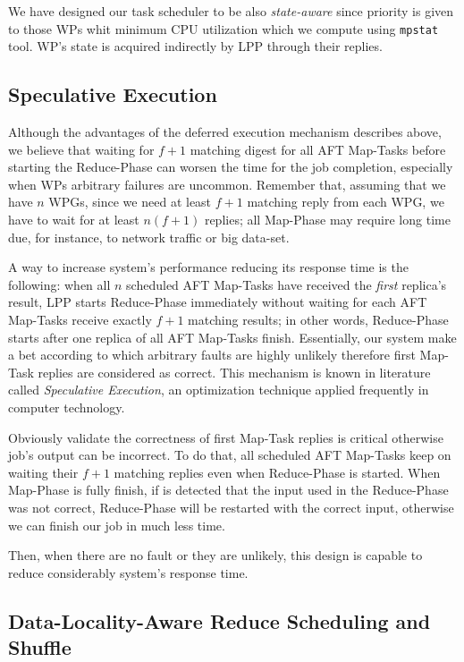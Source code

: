 \documentclass[sigchi]{acmart}
\begin{document}
We have designed our task scheduler to be also \textit{state-aware} since priority is given to those WPs whit minimum CPU utilization which we compute using \texttt{mpstat} tool. WP's state is acquired indirectly by LPP through their replies.

\subsection{Speculative Execution}

Although the advantages of the deferred execution mechanism describes above, we believe that waiting for $f + 1$ matching digest for all AFT Map-Tasks before starting the Reduce-Phase can worsen the time for the job completion, especially when WPs arbitrary failures are uncommon. Remember that, assuming that we have $n$ WPGs, since we need at least $f + 1$ matching reply from each WPG, we have to wait for at least $n(f + 1)$ replies; all Map-Phase may require long time due, for instance, to network traffic or big  data-set.

A way to increase system's performance reducing its response time is the following: when all $n$ scheduled AFT Map-Tasks have received the \textit{first} replica's result, LPP starts Reduce-Phase immediately without waiting for each AFT Map-Tasks receive exactly $f + 1$ matching results; in other words, Reduce-Phase starts after one replica of all AFT Map-Tasks finish. Essentially, our system make a bet according to which arbitrary faults are highly unlikely therefore first Map-Task replies are considered as correct. This mechanism is known in literature called \textit{Speculative Execution}, an optimization technique applied frequently in computer technology.

Obviously validate the correctness of first Map-Task replies is critical otherwise job's output can be incorrect. To do that, all scheduled AFT Map-Tasks keep on waiting their $f + 1$ matching replies even when Reduce-Phase is started. When Map-Phase is fully finish, if is detected that the input used in the Reduce-Phase was not correct, Reduce-Phase will be restarted with the correct input, otherwise we can finish our job in much less time.

Then, when there are no fault or they are unlikely, this design is capable to reduce considerably system's response time. 

\subsection{Data-Locality-Aware Reduce Scheduling and Shuffle}
\end{document}
